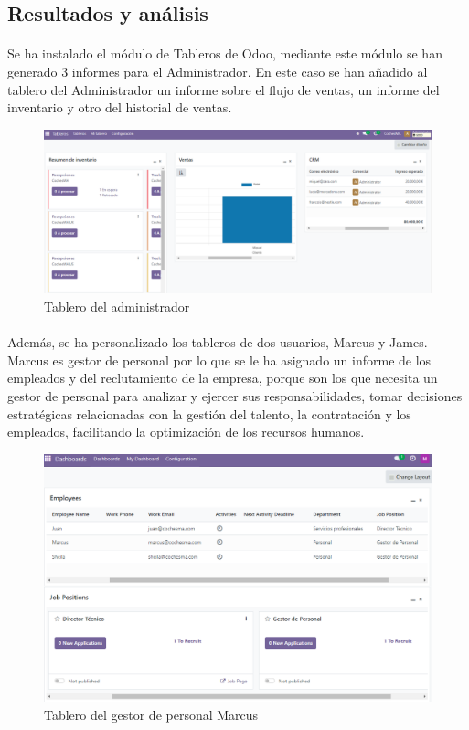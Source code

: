 \subsection{Resultados y análisis}
\paragraph{}
Se ha instalado el módulo de Tableros de Odoo, mediante este módulo se han generado 3 informes para el Administrador. En este caso se han añadido al tablero del Administrador un informe sobre el flujo de ventas, un informe del inventario y otro del historial de ventas. 
\begin{figure}[h]
    \centering
    \includegraphics[width=1\linewidth]{fotosDecisiones/admin.png}
    \caption{Tablero del administrador}
    \label{fig:enter-label}
\end{figure}
\paragraph{}
Además, se ha personalizado los tableros de dos usuarios, Marcus y James. Marcus es gestor de personal por lo que se le ha asignado un informe de los empleados y del reclutamiento de la empresa, porque son los que necesita un gestor de personal para analizar y ejercer sus responsabilidades, tomar decisiones estratégicas relacionadas con la gestión del talento, la contratación y los empleados, facilitando la optimización de los recursos humanos. 
\begin{figure}[h]
    \centering
    \includegraphics[width=0.9\linewidth]{fotosDecisiones/marcus.png}
    \caption{Tablero del gestor de personal Marcus}
    \label{fig:enter-label}
\end{figure}
